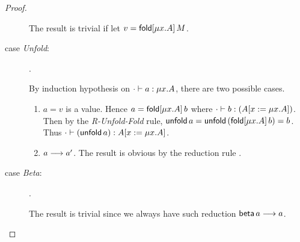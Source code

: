\begin{proof}
\begin{description}
  The result is trivial if let $v=\mathsf{fold}[\mu x.A]\,M$.
\item[case \emph{Unfold}:] %
                      {}.

  By induction hypothesis on $\cdot \vdash a:\mu x.A$, there are
  two possible cases.
  \begin{enumerate}
  \item $a=v$ is a value. Hence $a=\mathsf{fold}[\mu x.A]\,b$ where $\cdot \vdash b:(A[x:=\mu x.A])$. Then by the \emph{R-Unfold-Fold} rule, $\mathsf{unfold}\,a=\mathsf{unfold}\,(\mathsf{fold}[\mu x.A]\,b) = b$. Thus $\cdot \vdash (\mathsf{unfold}\,a):A[x:=\mu x.A]$.
  \item $a \longrightarrow a'$. The result is obvious by the
    reduction rule 
    .
  \end{enumerate}
\item[case \emph{Beta}:] 
    .

  The result is trivial since we always have such reduction $\mathsf{beta}\,a \longrightarrow a$.
\end{description}

\end{proof}
